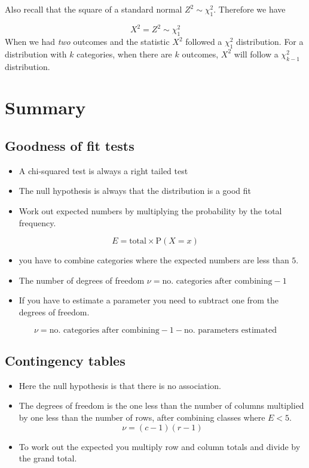 \documentclass[
]{book}
\theoremstyle{definition}
\theoremstyle{definition}
\theoremstyle{definition}
\theoremstyle{definition}
\theoremstyle{remark}
\begin{document}
Also recall that the square of a standard normal \(Z^2 \sim \chi^2_1\). Therefore we have

\[X^2 = Z^2 \sim \chi^2_1\]
When we had \emph{two} outcomes and the statistic \(X^2\) followed a \(\chi^2_1\) distribution. For a distribution with \(k\) categories, when there are \(k\) outcomes, \(X^2\) will follow a \(\chi^2_{k-1}\) distribution.

\hypertarget{summary-2}{%
\section{Summary}\label{summary-2}}

\hypertarget{goodness-of-fit-tests}{%
\subsection{Goodness of fit tests}\label{goodness-of-fit-tests}}

\begin{itemize}
\item
  A chi-squared test is always a right tailed test
\item
  The null hypothesis is always that the distribution is a good fit
\item
  Work out expected numbers by multiplying the probability by the total frequency.
\end{itemize}

\[E = \text{total}\times \text{P}(X=x)\]

\begin{itemize}
\item
  you have to combine categories where the expected numbers are less than \(5\).
\item
  The number of degrees of freedom \(\nu = \text{no. categories after combining} - 1\)
\item
  If you have to estimate a parameter you need to subtract one from the degrees of freedom.
\end{itemize}

\[\nu = \text{no. categories after combining} - 1 - \text{no. parameters estimated}\]

\hypertarget{contingency-tables}{%
\subsection{Contingency tables}\label{contingency-tables}}

\begin{itemize}
\item
  Here the null hypothesis is that there is no association.
\item
  The degrees of freedom is the one less than the number of columns multiplied by one less than the number of rows, after combining classes where \(E<5\).
  \[\nu =  (c-1)(r-1)\]
\item
  To work out the expected you multiply row and column totals and divide by the grand total.
\end{itemize}
\end{document}
